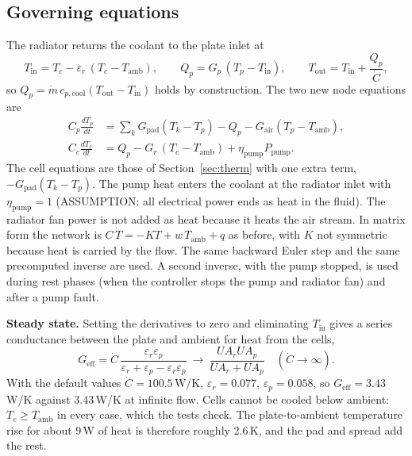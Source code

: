 \documentclass[11pt,a4paper]{article}
\begin{document}
\subsection{Governing equations}
The radiator returns the coolant to the plate inlet at
\begin{equation}
T_{\mathrm{in}}=T_c-\varepsilon_r\,(T_c-T_{\mathrm{amb}}),\qquad
Q_p=G_p\,(T_p-T_{\mathrm{in}}),\qquad
T_{\mathrm{out}}=T_{\mathrm{in}}+\frac{Q_p}{\dot C},
\end{equation}
so $Q_p=\dot m\,c_{p,\mathrm{cool}}(T_{\mathrm{out}}-T_{\mathrm{in}})$ holds by construction. The two new node equations are
\begin{align}
C_p\frac{dT_p}{dt}&=\sum_{k}G_{\mathrm{pad}}(T_k-T_p)-Q_p-G_{\mathrm{air}}(T_p-T_{\mathrm{amb}}),\\
C_c\frac{dT_c}{dt}&=Q_p-G_r\,(T_c-T_{\mathrm{amb}})+\eta_{\mathrm{pump}}P_{\mathrm{pump}} .
\end{align}
The cell equations are those of Section~\ref{sec:therm} with one extra term, $-G_{\mathrm{pad}}(T_k-T_p)$. The pump heat enters the coolant at the radiator inlet with $\eta_{\mathrm{pump}}=1$ (ASSUMPTION: all electrical power ends as heat in the fluid). The radiator fan power is not added as heat because it heats the air stream. In matrix form the network is $C\,\dot T=-KT+w\,T_{\mathrm{amb}}+q$ as before, with $K$ not symmetric because heat is carried by the flow. The same backward Euler step and the same precomputed inverse are used. A second inverse, with the pump stopped, is used during rest phases (when the controller stops the pump and radiator fan) and after a pump fault.

\textbf{Steady state.} Setting the derivatives to zero and eliminating $T_{\mathrm{in}}$ gives a series conductance between the plate and ambient for heat from the cells,
\begin{equation}
G_{\mathrm{eff}}=\dot C\,\frac{\varepsilon_r\varepsilon_p}{\varepsilon_r+\varepsilon_p-\varepsilon_r\varepsilon_p}\ \longrightarrow\ \frac{UA_rUA_p}{UA_r+UA_p}\quad(\dot C\to\infty).
\end{equation}
With the default values $\dot C=100.5$\,W/K, $\varepsilon_r=0.077$, $\varepsilon_p=0.058$, so $G_{\mathrm{eff}}=3.43$\,W/K against $3.43$\,W/K at infinite flow. Cells cannot be cooled below ambient: $T_c\ge T_{\mathrm{amb}}$ in every case, which the tests check. The plate-to-ambient temperature rise for about 9\,W of heat is therefore roughly 2.6\,K, and the pad and spread add the rest.
\end{document}
